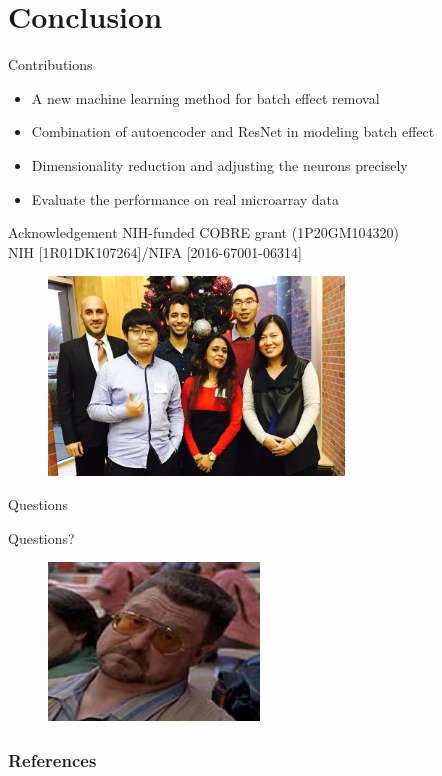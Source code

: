 \documentclass{beamer}
\begin{document}
\section{Conclusion}
\begin{frame}{Contributions}
  \begin{itemize}
    \item A new machine learning method  for batch effect removal
    \item Combination  of autoencoder and ResNet in modeling batch effect
    \item Dimensionality reduction and adjusting the neurons precisely
    \item Evaluate the performance on real microarray data
  \end{itemize}
\end{frame}
\begin{frame}{Acknowledgement}
  NIH-funded COBRE grant (1P20GM104320) \\
  NIH [1R01DK107264]/NIFA [2016-67001-06314]

  \begin{figure}[ht]
    \centering
    \includegraphics[width=0.7\textwidth]{figures/sbbi.jpg}
    \caption*{\label{fig:sbbi}}
  \end{figure}

\end{frame}
\begin{frame}{Questions}
	\begin{center}
		\Huge{Questions?}
	\end{center}
	\begin{figure}
		\centering
		\includegraphics[width=0.5\textwidth, height=1.0\textheight, keepaspectratio]{figures/walter.jpg}
	\end{figure}
\end{frame}
\begin{frame}[allowframebreaks]
	\frametitle{References}
	\printbibliography{}
\end{frame}
\end{document}
